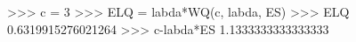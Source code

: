 
>>> c = 3
>>> ELQ = labda*WQ(c, labda, ES)
>>> ELQ
0.6319915276021264
>>> c-labda*ES
1.1333333333333333

